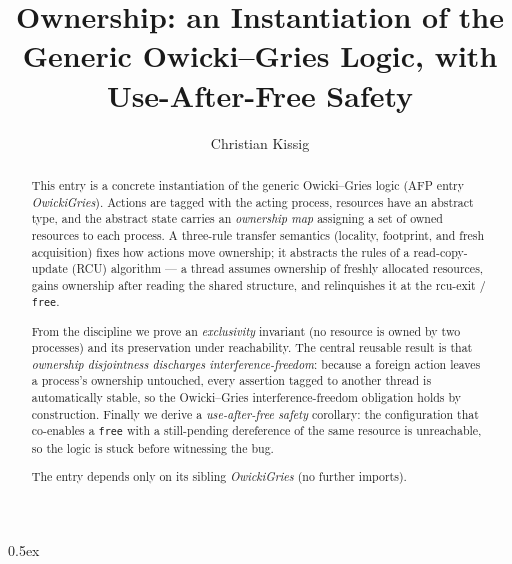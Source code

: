 \documentclass[11pt,a4paper]{article}
\begin{document}
\title{Ownership: an Instantiation of the Generic Owicki--Gries Logic, with
  Use-After-Free Safety}
\author{Christian Kissig}
\maketitle

\begin{abstract}
  This entry is a concrete instantiation of the generic Owicki--Gries logic
  (AFP entry \emph{OwickiGries}).  Actions are tagged with the acting process,
  resources have an abstract type, and the abstract state carries an
  \emph{ownership map} assigning a set of owned resources to each process.  A
  three-rule transfer semantics (locality, footprint, and fresh acquisition)
  fixes how actions move ownership; it abstracts the rules of a read-copy-update
  (RCU) algorithm --- a thread assumes ownership of freshly allocated resources,
  gains ownership after reading the shared structure, and relinquishes it at the
  rcu-exit / \texttt{free}.

  From the discipline we prove an \emph{exclusivity} invariant (no resource is
  owned by two processes) and its preservation under reachability.  The central
  reusable result is that \emph{ownership disjointness discharges
  interference-freedom}: because a foreign action leaves a process's ownership
  untouched, every assertion tagged to another thread is automatically stable,
  so the Owicki--Gries interference-freedom obligation holds by construction.
  Finally we derive a \emph{use-after-free safety} corollary: the configuration
  that co-enables a \texttt{free} with a still-pending dereference of the same
  resource is unreachable, so the logic is stuck before witnessing the bug.

  The entry depends only on its sibling \emph{OwickiGries} (no further imports).
\end{abstract}

\tableofcontents

\parindent 0pt\parskip 0.5ex


\end{document}
